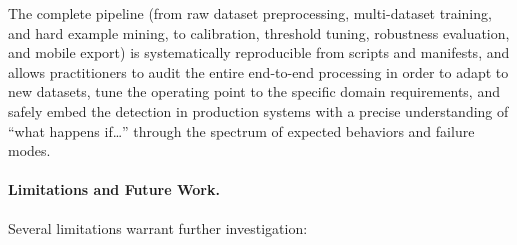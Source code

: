The complete pipeline (from raw dataset preprocessing, multi\hyp dataset training, and hard example mining, to calibration, threshold tuning, robustness evaluation, and mobile export) is systematically reproducible from scripts and manifests, and allows practitioners to audit the entire end\hyp to\hyp end processing in order to adapt to new datasets, tune the operating point to the specific domain requirements, and safely embed the detection in production systems with a precise understanding of ``what happens if\ldots'' through the spectrum of expected behaviors and failure modes.

\paragraph{Limitations and Future Work.}
Several limitations warrant further investigation:

